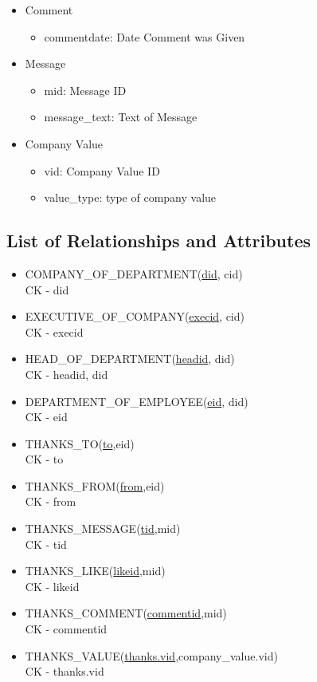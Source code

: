 \documentclass[11pt]{report}
\begin{document}
\begin{itemize}
\item Comment
    \begin{itemize}
    \item commentdate: Date Comment was Given
    \end{itemize}
\item Message
    \begin{itemize}
    \item mid: Message ID
    \item message\_text: Text of Message
    \end{itemize}
\item Company Value
    \begin{itemize}
    \item vid: Company Value ID
    \item value\_type: type of company value
    \end{itemize}
\end{itemize}
\clearpage

\subsection{List of Relationships and Attributes}
\begin{itemize}
\item COMPANY\_OF\_DEPARTMENT(\underline{did}, cid) \\
CK - did \\
\item EXECUTIVE\_OF\_COMPANY(\underline{execid}, cid) \\
CK - execid \\
\item HEAD\_OF\_DEPARTMENT(\underline{headid}, did) \\
CK - headid, did \\
\item DEPARTMENT\_OF\_EMPLOYEE(\underline{eid}, did) \\
CK - eid \\
\item THANKS\_TO(\underline{to},eid) \\
CK - to\\
\item THANKS\_FROM(\underline{from},eid) \\
CK - from\\
\item THANKS\_MESSAGE(\underline{tid},mid) \\
CK - tid\\
\item THANKS\_LIKE(\underline{likeid},mid) \\
CK - likeid\\
\item THANKS\_COMMENT(\underline{commentid},mid) \\
CK - commentid\\
\item THANKS\_VALUE(\underline{thanks.vid},company\_value.vid) \\
CK - thanks.vid\\
\end{itemize}
\clearpage
\end{document}
